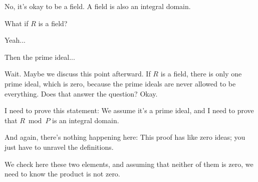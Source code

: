\begin{speech}[00:57:40 - 00:57:44]
No, it's okay to be a field. A field is also an integral domain.
\end{speech}

\begin{student}
What if $R$ is a field?
\end{student}

\begin{speech}[00:57:46 - 00:57:47]
Yeah...
\end{speech}

\begin{student}
Then the prime ideal...
\end{student}

\begin{speech}[00:57:53 - 00:58:06]
Wait. Maybe we discuss this point afterward. If $R$ is a field, there is only one prime ideal, which is zero, because the prime ideals are never allowed to be everything. Does that answer the question? Okay.
\end{speech}

\begin{speech}[00:58:07 - 00:58:38]
I need to prove this statement: We assume it's a prime ideal, and I need to prove that $R \bmod P$ is an integral domain.

And again, there's nothing happening here: This proof has like zero ideas; you just have to unravel the definitions.

We check here these two elements, and assuming that neither of them is zero, we need to know the product is not zero.
\end{speech}

